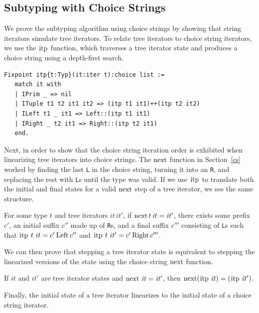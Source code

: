 \documentclass[a4paper,english]{lipics-v2019}
\renewcommand{\L}{{\tt L}\xspace}
\newcommand{\Ls}{{\tt L}s\xspace}
\newcommand{\R}{{\tt R}\xspace}
\newcommand{\Rs}{{\tt R}s\xspace}
\renewcommand{\c}[1]{\ensuremath{\text{\lstinline{#1}}}\xspace}
\begin{document}
\subsection{Subtyping with Choice Strings}

We prove the subtyping algorithm using choice strings by showing that string
iterators simulate tree iterators.  To relate tree iterators to choice
string iterators, we use the \c{itp} function, which traverses a tree
iterator state and produces a choice string using a depth-first search.


\begin{lstlisting}
Fixpoint itp{t:Typ}(it:iter t):choice list :=
   match it with
   | IPrim _ => nil
   | ITuple t1 t2 it1 it2 => (itp t1 it1)++(itp t2 it2)
   | ILeft t1 _ it1 => Left::(itp t1 it1)
   | IRight _ t2 it1 => Right::(itp t2 it1)
   end.
\end{lstlisting}

\noindent
Next, in order to show that the choice string iteration order is exhibited
when linearizing tree iterators into choice strings.  The \c{next} function
in Section~\ref{cs} worked by finding the last \L in the choice string,
turning it into an \R, and replacing the rest with \Ls until the type was
valid. If we use \c{itp} to translate both the initial and final states for a valid
\c{next} step of a tree iterator, we see the same structure.

\begin{lemma}
\label{lem:snt}
For some type $t$ and tree iterators $\mathit{it}\,\mathit{it}'$, if
$\c{next}\,t\,\mathit{it}=\mathit{it'}$, there exists some prefix  $c'$, an
initial suffix $c''$ made up of \Rs, and a final suffix  $c'''$
consisting of \Ls such that $\c{itp}~t~it=c'\,\c{Left}\,c''$ and 
$\c{itp}~t~it'=c'\,\c{Right}\,c'''$.
\end{lemma}

\noindent
We can then prove that stepping a tree iterator state is equivalent to
stepping the linearized versions of the state using the choice string
\c{next} function.

\begin{lemma}\label{sctxcorr}
If $\mathit{it}$ and $\mathit{it'}$ are tree iterator states and
$\c{next}~\mathit{it}=\mathit{it}'$, then $\c{next} (\c{itp}\;\mathit{it}) =
(\c{itp}\;\mathit{it'})$.
\end{lemma}
\noindent
Finally, the initial state of a tree iterator linearizes to the
initial state of a choice string iterator.
\end{document}

